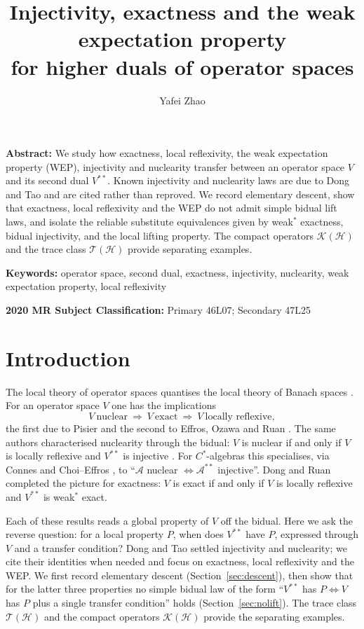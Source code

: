 \documentclass[12pt]{article}
\title{Injectivity, exactness and the weak expectation property\\ for higher duals of operator spaces}
\author{Yafei Zhao}
\date{}
\theoremstyle{definition}
\theoremstyle{remark}
\newcommand{\K}{\mathcal{K}}
\newcommand{\T}{\mathcal{T}}
\newcommand{\Hil}{\mathcal{H}}
\begin{document}
\maketitle

\begin{center}
\begin{minipage}{11.5cm}
{\bf Abstract:} We study how exactness, local reflexivity, the weak
expectation property (WEP), injectivity and nuclearity transfer between an
operator space $V$ and its second dual $V^{**}$. Known injectivity and
nuclearity laws are due to Dong and Tao and are cited rather than reproved.
We record elementary descent, show that exactness, local reflexivity and the
WEP do not admit simple bidual lift laws, and isolate the reliable substitute
equivalences given by weak$^*$ exactness, bidual injectivity, and the local
lifting property. The compact operators $\K(\Hil)$ and the trace class
$\T(\Hil)$ provide separating examples.
\par
{\bf Keywords:} operator space, second dual, exactness, injectivity,
nuclearity, weak expectation property, local reflexivity
\par
{\bf 2020 MR Subject Classification:} Primary 46L07; Secondary 47L25
\end{minipage}
\end{center}

\section{Introduction}

The local theory of operator spaces quantises the local theory of Banach
spaces \cite{Ru89,Ble92}. For an operator space $V$ one has the implications
\begin{equation}\label{eq:chain}
V\ \text{nuclear}\ \Longrightarrow\ V\ \text{exact}\ \Longrightarrow\ V\
\text{locally reflexive},
\end{equation}
the first due to Pisier \cite{Pi92} and the second to Effros, Ozawa and Ruan
\cite{EOR}. The same authors characterised nuclearity through the bidual:
$V$ is nuclear if and only if $V$ is locally reflexive and $V^{**}$ is
injective \cite{EOR}. For $C^*$-algebras this specialises, via Connes
\cite{Co76} and Choi--Effros \cite{CE76,CE77}, to ``$\mathcal A$ nuclear
$\iff\mathcal A^{**}$ injective''. Dong and Ruan \cite{DR} completed the
picture for exactness: $V$ is exact if and only if $V$ is locally reflexive
and $V^{**}$ is weak$^*$ exact.

Each of these results reads a global property of $V$ off the bidual. Here we
ask the reverse question: for a local property $P$, when does $V^{**}$ have
$P$, expressed through $V$ and a transfer condition? Dong and Tao \cite{DT}
settled injectivity and nuclearity; we cite their identities when needed and
focus on exactness, local reflexivity and the WEP. We first record elementary
descent (Section~\ref{sec:descent}), then show that for the latter three
properties no simple bidual law of the form ``$V^{**}$ has $P\iff V$ has $P$
plus a single transfer condition'' holds (Section~\ref{sec:nolift}). The trace
class $\T(\Hil)$ and the compact operators $\K(\Hil)$ provide the separating
examples.
\end{document}
